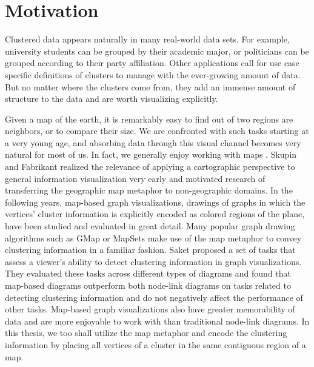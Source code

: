 \section{Motivation}
\label{sect:motivation}


Clustered data appears naturally in many real-world data sets. For example, university students can be grouped by their academic major, or politicians can be grouped according to their party affiliation. Other applications call for use case specific definitions of clusters to manage with the ever-growing amount of data. But no matter where the clusters come from, they add an immense amount of structure to the data and are worth visualizing explicitly.

Given a map of the earth, it is remarkably easy to find out of two regions are neighbors, or to compare their size. We are confronted with such tasks starting at a very young age, and absorbing data through this visual channel becomes very natural for most of us. In fact, we generally enjoy working with maps \cite{saket2016comparing}. Skupin and Fabrikant \cite{skupin2003spatialization} realized the relevance of applying a cartographic perspective to general information visualization very early and motivated research of transferring the geographic map metaphor to non-geographic domains. In the following years, map-based graph visualizations, \ie{} drawings of graphs in which the vertices' cluster information is explicitly encoded as colored regions of the plane, have been studied and evaluated in great detail. Many popular graph drawing algorithms such as GMap \cite{gansner2009gmap} or MapSets \cite{efrat2014mapsets} make use of the map metaphor to convey clustering information in a familiar fashion. Saket \etal{} \cite{saket2014group} proposed a set of tasks that assess a viewer's ability to detect clustering information in graph visualizations. They evaluated these tasks across different types of diagrams \cite{saket2014node} and found that map-based diagrams outperform both node-link diagrams on tasks related to detecting clustering information and do not negatively affect the performance of other tasks. Map-based graph visualizations also have greater memorability of data \cite{saket2015map} and are more enjoyable to work with \cite{saket2016comparing} than traditional node-link diagrams. In this thesis, we too shall utilize the map metaphor and encode the clustering information by placing all vertices of a cluster in the same contiguous region of a map.

